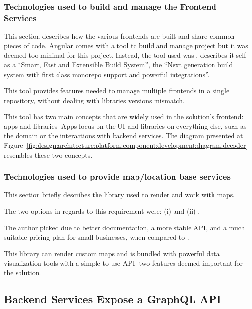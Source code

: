 \subsubsection{Technologies used to build and manage the Frontend Services}
\label{subsubsec:implementation:decisions:frontend:nx}

This section describes how the various frontends are built and share common pieces of code. Angular comes with a tool to build and manage project but it was deemed too minimal for this project. Instead, the tool used was .  describes it self as a ``Smart, Fast and Extensible Build System'', the
``Next generation build system with first class monorepo support and powerful integrations''.

This tool provides features needed to manage multiple frontends in a single repository, without dealing with libraries versions mismatch.

This tool has two main concepts that are widely used in the solution's frontend: apps and libraries. Apps focus on the \gls{UI} and libraries on everything else, such as the domain or the interactions with backend services. The diagram presented at Figure~\ref{fig:design:architecture:platform:component:development:diagram:decoder} resembles these two concepts.

\subsubsection{Technologies used to provide map/location base services}
\label{subsubsec:implementation:decisions:frontend:maps}

This section briefly describes the library used to render and work with maps.

The two options in regards to this requirement were: (i)  and (ii) .

The author picked  due to better documentation, a more stable \gls{API}, and a much suitable pricing plan for small businesses, when compared to .

This library can render custom maps and is bundled with powerful data visualization tools with a simple to use \gls{API}, two features deemed important for the solution.

\subsection{Backend Services Expose a GraphQL API}
\label{subsec:implementation:decisions:graphql}

